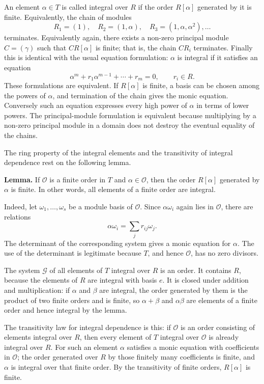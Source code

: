 \documentclass[12pt]{article}
\begin{document}
An element $\alpha\in T$ is called integral over $R$ if the order $R[\alpha]$ generated by it is finite. Equivalently, the chain of modules
\[
  R_1=(1),\quad R_2=(1,\alpha),\quad R_3=(1,\alpha,\alpha^2),\ldots
\]
terminates. Equivalently again, there exists a non-zero principal module $C=(\gamma)$ such that $C R[\alpha]$ is finite; that is, the chain $C R_i$ terminates. Finally this is identical with the usual equation formulation: $\alpha$ is integral if it satisfies an equation
\[
  \alpha^m+r_1\alpha^{m-1}+\cdots+r_m=0,
  \qquad r_i\in R.
\]
These formulations are equivalent. If $R[\alpha]$ is finite, a basis can be chosen among the powers of $\alpha$, and termination of the chain gives the monic equation. Conversely such an equation expresses every high power of $\alpha$ in terms of lower powers. The principal-module formulation is equivalent because multiplying by a non-zero principal module in a domain does not destroy the eventual equality of the chains.

The ring property of the integral elements and the transitivity of integral dependence rest on the following lemma.

\textbf{Lemma.} If $\mathcal O$ is a finite order in $T$ and $\alpha\in\mathcal O$, then the order $R[\alpha]$ generated by $\alpha$ is finite. In other words, all elements of a finite order are integral.

Indeed, let $\omega_1,\ldots,\omega_s$ be a module basis of $\mathcal O$. Since $\alpha\omega_i$ again lies in $\mathcal O$, there are relations
\[
  \alpha\omega_i=\sum_j r_{ij}\omega_j.
\]
The determinant of the corresponding system gives a monic equation for $\alpha$. The use of the determinant is legitimate because $T$, and hence $\mathcal O$, has no zero divisors.

The system $\mathcal G$ of all elements of $T$ integral over $R$ is an order. It contains $R$, because the elements of $R$ are integral with basis $e$. It is closed under addition and multiplication: if $\alpha$ and $\beta$ are integral, the order generated by them is the product of two finite orders and is finite, so $\alpha+\beta$ and $\alpha\beta$ are elements of a finite order and hence integral by the lemma.

The transitivity law for integral dependence is this: if $\mathcal O$ is an order consisting of elements integral over $R$, then every element of $T$ integral over $\mathcal O$ is already integral over $R$. For such an element $\alpha$ satisfies a monic equation with coefficients in $\mathcal O$; the order generated over $R$ by those finitely many coefficients is finite, and $\alpha$ is integral over that finite order. By the transitivity of finite orders, $R[\alpha]$ is finite.
\end{document}
